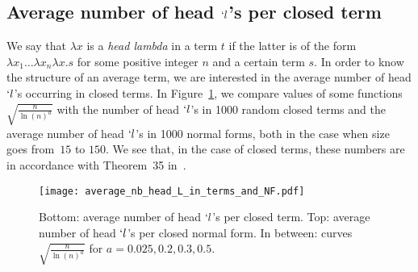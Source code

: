 \documentclass{jfp1}
\begin{document}
\subsection{Average number of head $`l$'s per closed term}
\label{sec:average-number-l}

We say that $\lambda x$ is a \emph{head lambda} in a term $t$ if the latter is of the
form $\lambda x_1 \ldots \lambda x_n \lambda x.s$ for some positive integer $n$ and a
certain term $s$.  In order to know the structure of an average term, we are
interested in the average number of head $`l$'s occurring in closed terms.  In
Figure~\ref{fig:L-in-terms}, we compare values of some functions $\sqrt{\frac{n}{\ln(n)^a}}$ 
with the number of head $`l$'s in 1000 random closed terms and
the average number of head $`l$'s in 1000 normal forms, both in the case when size
goes from~$15$ to $150$.  We see that, in the case of closed terms, these numbers are
in accordance with Theorem~35 in~\cite{DBLP:journals/corr/abs-0903-5505}.

\begin{figure}[thb!]
  \centering
  \texttt{[image: average\_nb\_head\_L\_in\_terms\_and\_NF.pdf]}
  \caption{\textsf{Bottom}: average number of head $`l$'s per closed term.
    \textsf{Top}: average number of head $`l$'s per closed normal form.
    \textsf{In between}: curves $\sqrt{\frac{n}{\ln(n)^a}}$ for $a=0.025,0.2,0.3,0.5$.}
  \label{fig:L-in-terms}
\end{figure}
\end{document}
